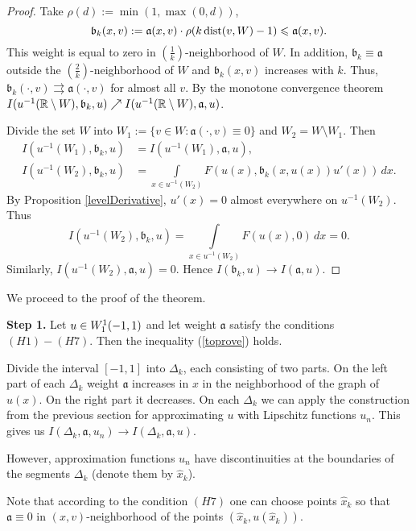 \begin{proof}
Take $\rho(d) := \min(1, \max(0, d))$,
$$\mathfrak b_k(x, v) := \mathfrak a(x, v) \cdot \rho(k \mathop{\rm dist}\nolimits(v, W) - 1) \leqslant \mathfrak a(x, v).$$
This weight is equal to zero in $\left(\frac{1}{k}\right)$-neighborhood of $W$.
In addition, $\mathfrak b_k \equiv \mathfrak a$ outside the $\left(\frac{2}{k}\right)$-neighborhood of $W$ and
$\mathfrak b_k(x, v)$ increases with $k$.
Thus, $\mathfrak b_k(\cdot, v) \rightrightarrows \mathfrak a(\cdot, v)$ for almost all $v$.
By the monotone convergence theorem
$I(u^{-1}(\mathbb R \setminus W), \mathfrak b_k, u) \nearrow I(u^{-1}(\mathbb R \setminus W), \mathfrak a, u)$.

Divide the set $W$ into $W_1 := \{v \in W: \mathfrak a(\cdot, v) \equiv 0\}$ and $W_2 = W \setminus W_1$.
Then
$$
\begin{aligned}
I(u^{-1}(W_1), \mathfrak b_k, u) &= I(u^{-1}(W_1), \mathfrak a, u),\\
I(u^{-1}(W_2), \mathfrak b_k, u) &= \int\limits_{x \in u^{-1}(W_2)} F(u(x), \mathfrak b_k(x, u(x)) u'(x)) \, dx.
\end{aligned}
$$
By Proposition \ref{levelDerivative}, $u'(x) = 0$ almost everywhere on $u^{-1}(W_2)$.
Thus
$$I(u^{-1}(W_2), \mathfrak b_k, u) = \int\limits_{x \in u^{-1}(W_2)} F(u(x), 0) \, dx = 0.$$
Similarly, $I(u^{-1}(W_2), \mathfrak a, u) = 0$. Hence $I(\mathfrak b_k, u) \to I(\mathfrak a, u)$.
\end{proof}

We proceed to the proof of the theorem.

\bigskip
{\bf Step 1.} Let $u \in W_1^1(-1, 1)$ and let weight $\mathfrak a$ satisfy the conditions $(H1)-(H7)$.
Then the inequality (\ref{toprove}) holds.

Divide the interval $[-1, 1]$ into $\Delta_k$, each consisting of two parts.
On the left part of each $\Delta_k$ weight $\mathfrak a$ increases in $x$ in the neighborhood
of the graph of $u(x)$. On the right part it decreases.
On each $\Delta_k$ we can apply the construction from the previous section
for approximating $u$ with Lipschitz functions $u_n$.
This gives us $I(\Delta_k, \mathfrak a, u_n) \to I(\Delta_k, \mathfrak a, u)$.

However, approximation functions $u_n$ have discontinuities at the boundaries of the segments $\Delta_k$
(denote them by $\hat{x}_k$).

Note that according to the condition $(H7)$ one can choose points $\hat{x}_k$ so
that $\mathfrak a \equiv 0$ in $(x, v)$-neighborhood of the points $(\hat{x}_k, u(\hat{x}_k))$.

